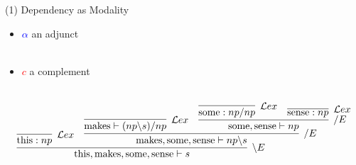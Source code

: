 \documentclass[aspectratio=169]{beamer}
\begin{document}
\begin{frame}{(1) Dependency as Modality}
{{		\begin{itemize}
			\item[] \textcolor{blue}{$\alpha$} an adjunct \\
			~
			\item[] \textcolor{red}{$c$} a complement\\
			~
		\end{itemize}
		\vfill
		
	}
	{
	\smaller
	\[
		\infer[\backslash E]{\text{this}, \text{makes}, \text{some}, \text{sense} \vdash s}{
			\infer[\mathcal{L}ex]{\text{this}: np}{}
			&
			\infer[/ E]{\text{makes}, \text{some}, \text{sense} \vdash np\backslash s}{
				\infer[\mathcal{L}ex]{\text{makes} \vdash(np \backslash s)/np}{}
				&
				\infer[/ E]{\text{some}, \text{sense} \vdash np}{
					\infer[\mathcal{L}ex]{\text{some}: np/ np}{}
					&
					\infer[\mathcal{L}ex]{\text{sense}: np}{}
				}
			}
		}
	\]
	}}
 \end{frame}
 
 \newcommand{\etext}[1]{\scriptsize {\textit{#1}}}
\end{document}

